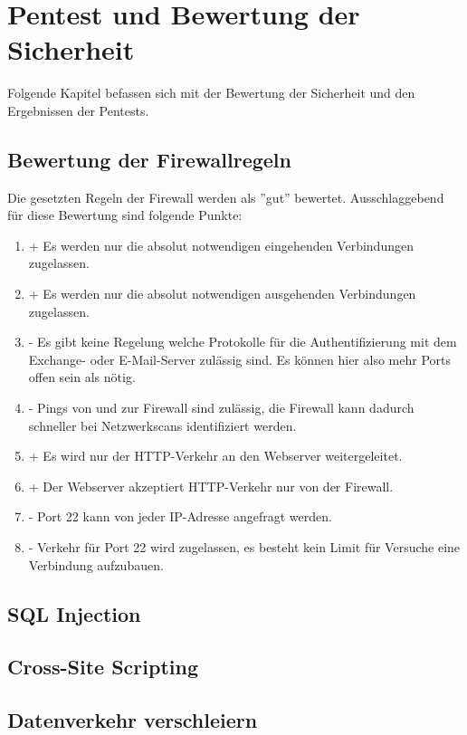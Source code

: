 \documentclass[
    a4paper,
    pagesize,
	pdftex,
    12pt,
]{scrartcl}
\begin{document}
\newpage
\section{Pentest und Bewertung der Sicherheit}
Folgende Kapitel befassen sich mit der Bewertung der Sicherheit und den Ergebnissen der Pentests.

\subsection{Bewertung der Firewallregeln}
Die gesetzten Regeln der Firewall werden als ''gut'' bewertet. Ausschlaggebend für diese Bewertung sind folgende Punkte:
\begin{enumerate}
	\item + Es werden nur die absolut notwendigen eingehenden Verbindungen zugelassen.
	\item + Es werden nur die absolut notwendigen ausgehenden Verbindungen zugelassen.
	\item - Es gibt keine Regelung welche Protokolle für die Authentifizierung mit dem Exchange- oder E-Mail-Server zulässig sind. Es können hier also mehr Ports offen sein als nötig.
	\item - Pings von und zur Firewall sind zulässig, die Firewall kann dadurch schneller bei Netzwerkscans identifiziert werden.
	\item + Es wird nur der HTTP-Verkehr an den Webserver weitergeleitet.
	\item + Der Webserver akzeptiert HTTP-Verkehr nur von der Firewall.
	\item - Port 22 kann von jeder IP-Adresse angefragt werden.
	\item - Verkehr für Port 22 wird zugelassen, es besteht kein Limit für Versuche eine Verbindung aufzubauen.
\end{enumerate}

\subsection{SQL Injection}

\subsection{Cross-Site Scripting}

\subsection{Datenverkehr verschleiern}
\end{document}
